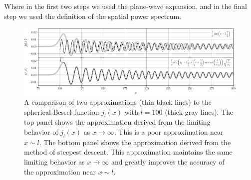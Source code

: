 \begin{bibunit}
\begin{subappendices}
Where in the first two steps we used the plane-wave expansion, and in the final step we used the
definition of the spatial power spectrum.

\begin{figure}
    \centering
    \includegraphics[width=\textwidth]{figures/chapter4/spherical-bessel-functions}
    \caption{
        A comparison of two approximations (thin black lines) to the spherical Bessel function
        $j_l(x)$ with $l=100$ (thick gray lines). The top panel shows the approximation derived from
        the limiting behavior of $j_l(x)$ as $x\rightarrow\infty$. This is a poor approximation near
        $x\sim l$. The bottom panel shows the approximation derived from the method of steepest
        descent. This approximation maintains the same limiting behavior as $x\rightarrow\infty$ and
        greatly improves the accuracy of the approximation near $x\sim l$.
    }
    \label{fig:bessel-approximations}
\end{figure}


\end{subappendices}
\end{bibunit}
